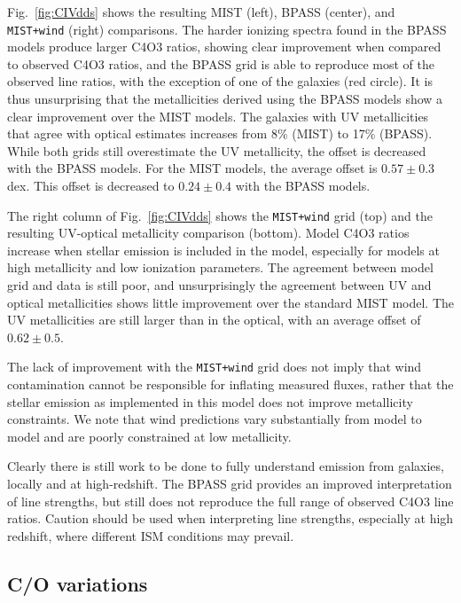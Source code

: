 \documentclass[trackchanges, preprint2]{aastex62}
\newcommand{\civ}{\ion{C}{4}}
\begin{document}
Fig.~\ref{fig:CIVdds} shows the resulting MIST (left), BPASS (center), and {\tt MIST+wind} (right) comparisons. The harder ionizing spectra found in the BPASS models produce larger C4O3 ratios, showing clear improvement when compared to observed C4O3 ratios, and the BPASS grid is able to reproduce most of the observed line ratios, with the exception of one of the \citet{Senchyna+2017} galaxies (red circle). It is thus unsurprising that the metallicities derived using the BPASS models show a clear improvement over the MIST models. The galaxies with UV metallicities that agree with optical estimates increases from 8\% (MIST) to 17\% (BPASS). While both grids still overestimate the UV metallicity, the offset is decreased with the BPASS models. For the MIST models, the average offset is $0.57 \pm 0.3$ dex. This offset is decreased to $0.24 \pm 0.4$ with the BPASS models.

The right column of Fig.~\ref{fig:CIVdds} shows the {\tt MIST+wind} grid (top) and the resulting UV-optical metallicity comparison (bottom). Model C4O3 ratios increase when stellar emission is included in the model, especially for models at high metallicity and low ionization parameters. The agreement between model grid and data is still poor, and unsurprisingly the agreement between UV and optical metallicities shows little improvement over the standard MIST model. The UV metallicities are still larger than in the optical, with an average offset of $0.62 \pm 0.5$.

The lack of improvement with the {\tt MIST+wind} grid does not imply that wind contamination cannot be responsible for inflating measured \civ{} fluxes, rather that the stellar emission as implemented in this model does not improve metallicity constraints. We note that wind predictions vary substantially from model to model and are poorly constrained at low metallicity.

Clearly there is still work to be done to fully understand \civ{} emission from galaxies, locally and at high-redshift. The BPASS grid provides an improved interpretation of \civ{} line strengths, but still does not reproduce the full range of observed C4O3 line ratios. Caution should be used when interpreting \civ{} line strengths, especially at high redshift, where different ISM conditions may prevail.

\subsection{C/O variations} \label{sec:discussion:CIII}
\end{document}
